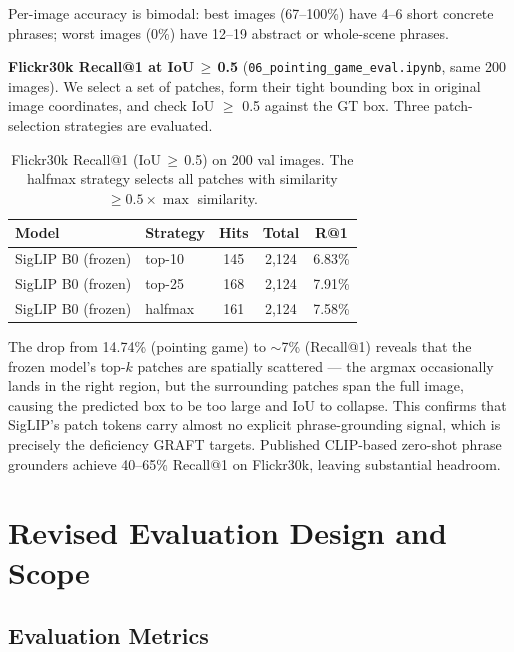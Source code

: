 \documentclass[10pt,onecolumn]{article}
\begin{document}
Per-image accuracy is bimodal: best images (67--100\%) have 4--6 short concrete
phrases; worst images (0\%) have 12--19 abstract or whole-scene phrases.

\textbf{Flickr30k Recall@1 at IoU\,$\geq$\,0.5}
(\texttt{06\_pointing\_game\_eval.ipynb}, same 200 images). We select a set of
patches, form their tight bounding box in original image coordinates, and check
IoU $\geq$ 0.5 against the GT box. Three patch-selection strategies are evaluated.

\begin{table}[h]
\centering
\small
\begin{tabular}{llccc}
\toprule
\textbf{Model} & \textbf{Strategy} & \textbf{Hits} & \textbf{Total} & \textbf{R@1} \\
\midrule
SigLIP B0 (frozen) & top-10  & 145 & 2,124 & 6.83\% \\
SigLIP B0 (frozen) & top-25  & 168 & 2,124 & 7.91\% \\
SigLIP B0 (frozen) & halfmax & 161 & 2,124 & 7.58\% \\
\bottomrule
\end{tabular}
\caption{Flickr30k Recall@1 (IoU\,$\geq$\,0.5) on 200 val images. The halfmax
strategy selects all patches with similarity $\geq 0.5\times\max$ similarity.}
\end{table}

The drop from 14.74\% (pointing game) to $\sim$7\% (Recall@1) reveals that the
frozen model's top-$k$ patches are spatially scattered --- the argmax occasionally
lands in the right region, but the surrounding patches span the full image, causing
the predicted box to be too large and IoU to collapse. This confirms that SigLIP's
patch tokens carry almost no explicit phrase-grounding signal, which is precisely
the deficiency GRAFT targets. Published CLIP-based zero-shot phrase grounders
achieve 40--65\% Recall@1 on Flickr30k, leaving substantial headroom.

\section{Revised Evaluation Design and Scope}

\subsection{Evaluation Metrics}
\end{document}
